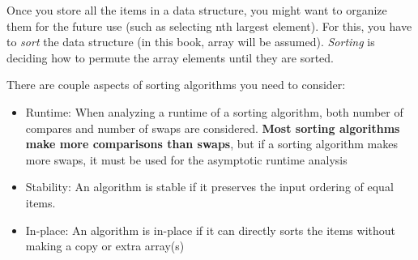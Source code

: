 
Once you store all the items in a data structure, you might want to organize them for the future use (such as selecting nth largest element). For this, you have to \textit{sort} the data structure (in this book, array will be assumed). \textit{Sorting} is deciding how to permute the array elements until they are sorted.

There are couple aspects of sorting algorithms you need to consider:

\begin{itemize}
  \item Runtime: When analyzing a runtime of a sorting algorithm, both number of compares and number of swaps are considered. \textbf{Most sorting algorithms make more comparisons than swaps}, but if a sorting algorithm makes more swaps, it must be used for the asymptotic runtime analysis
  \item Stability: An algorithm is stable if it preserves the input ordering of equal items.
    \begin{center}
    \end{center}
  \item In-place: An algorithm is in-place if it can directly sorts the items without making a copy or extra array(s)
\end{itemize}

